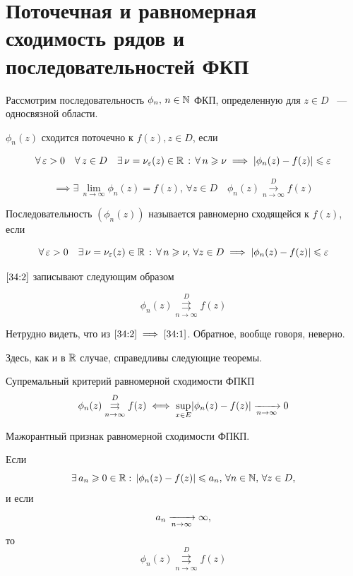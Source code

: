 \documentclass[../../main.tex]{subfiles}
\begin{document}
\section{Поточечная и равномерная сходимость рядов и последовательностей ФКП}

Рассмотрим последовательность $ \phi_n,\, n \in \mathbb{N} $ ФКП, определенную для $ z 
\in D $ ~--- односвязной области.

$ \phi_n(z) $ сходится поточечно к $ f(z), z \in D $, если

\begin{equation}\label{34:1}
	\forall\, \varepsilon > 0 \quad \forall\, z \in D \quad \exists\, \nu = \nu_\varepsilon (z) 
	\in \mathbb{R}\, :\,
	\forall\, n \geqslant \nu \implies |\phi_n(z) - f(z)| \leqslant \varepsilon
\end{equation}

\[ \implies \exists\, \underset{n \to \infty}{\lim} \phi_n (z) = f(z),\, 
\forall z \in D \quad \phi_n(z) \overset{D}{\underset{n \to 
\infty}\longrightarrow} f(z) \]

Последовательность $ (\phi_n(z)) $ называется равномерно сходящейся к $ f(z) 
$, если

\begin{equation}\label{34:2}
	\forall\, \varepsilon > 0 \quad \exists\, \nu = \nu_\varepsilon (z) \in \mathbb{R}\, :\,
	\forall\, n \geqslant \nu,\, \forall z \in D \implies |\phi_n(z) - f(z)| \leqslant \varepsilon
\end{equation}

$ \eqref{34:2} $ записывают следующим образом

\[ \phi_n(z) \overset{D}{\underset{n \to \infty}\rightrightarrows} f(z) \]

Нетрудно видеть, что из $ \eqref{34:2} \implies \eqref{34:1} $. Обратное, 
вообще говоря, неверно.

Здесь, как и в $\mathbb{R}$ случае, справедливы следующие теоремы.

\begin{thm}{Супремальный критерий равномерной сходимости ФПКП}
	\[ \phi_n(z) \overset{D}{\underset{n \to \infty}\rightrightarrows} f(z) \iff 
	\underset{x \in E}{\sup}|\phi_n(z) - f(z)| \xrightarrow[n \rightarrow \infty]{} 0 \]
\end{thm}

\begin{thm}{Мажорантный признак равномерной сходимости ФПКП.}
	\;
	
	Если 
	\[ \exists\, a_n \geqslant 0 \in \mathbb{R} :\, |\phi_n(z) - f(z)| \leqslant a_n,\, \forall n 
	\in \mathbb{N},\, \forall z \in D, \]
	и если \[ a_n \xrightarrow[n \rightarrow \infty]{} \infty, \]
	то \[ \phi_n(z) \overset{D}{\underset{n \to \infty}\rightrightarrows} f(z) \]
\end{thm}
\end{document}

